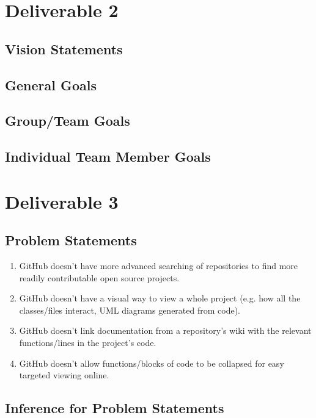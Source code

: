 \documentclass[12pt]{article}
\begin{document}
\vfill
\setcounter{section}{2}
\setcounter{subsection}{0}
\section*{Deliverable 2}
\subsection{Vision Statements}
\subsection{General Goals}
\subsection{Group/Team Goals}
\subsection{Individual Team Member Goals}

\pagebreak
\setcounter{section}{3}
\setcounter{subsection}{0}
\section*{Deliverable 3}
\subsection{Problem Statements}
\begin{enumerate}
\item GitHub doesn't have more advanced searching of repositories to find more readily contributable open source projects.
\item GitHub doesn't have a visual way to view a whole project (e.g. how all the classes/files interact, UML diagrams generated from code).
\item GitHub doesn't link documentation from a repository's wiki with the relevant functions/lines in the project's code.
\item GitHub doesn't allow functions/blocks of code to be collapsed for easy targeted viewing online.
\end{enumerate}
\subsection{Inference for Problem Statements}
\end{document}
